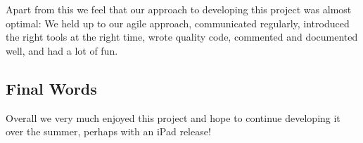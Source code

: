 \documentclass[a4wide, 11pt]{article}
\begin{document}
Apart from this we feel that our approach to developing this project was almost optimal: We held up to our agile approach, communicated regularly, introduced the right tools at the right time, wrote quality code, commented and documented well, and had a lot of fun.

\subsection{Final Words}

Overall we very much enjoyed this project and hope to continue developing it over the summer, perhaps with an iPad release!
\end{document}
